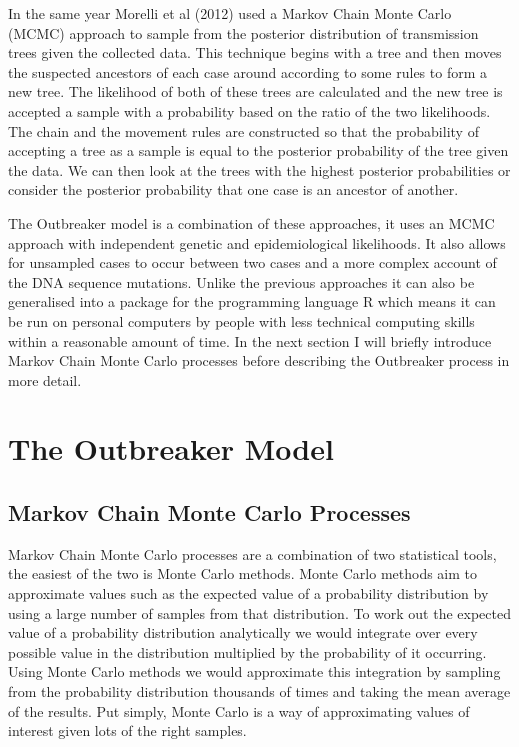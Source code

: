 \documentclass{article}
\begin{document}
In the same year Morelli et al (2012) used a Markov Chain Monte Carlo (MCMC) approach to sample from the posterior distribution of transmission trees given the collected data. This technique begins with a tree and then moves the suspected ancestors of each case around according to some rules to form a new tree. The likelihood of both of these trees are calculated and the new tree is accepted a sample with a probability based on the ratio of the two likelihoods. The chain and the movement rules are constructed so that the probability of accepting a tree as a sample is equal to the posterior probability of the tree given the data. We can then look at the trees with the highest posterior probabilities or consider the posterior probability that one case is an ancestor of another.

The Outbreaker model is a combination of these approaches, it uses an MCMC approach with independent genetic and epidemiological likelihoods. It also allows for unsampled cases to occur between two cases and a more complex account of the DNA sequence mutations. Unlike the previous approaches it can also be generalised into a package for the programming language R which means it can be run on personal computers by people with less technical computing skills within a reasonable amount of time. In the next section I will briefly introduce Markov Chain Monte Carlo processes before describing the Outbreaker process in more detail.

\section{The Outbreaker Model}
\subsection{Markov Chain Monte Carlo Processes}
Markov Chain Monte Carlo processes are a combination of two statistical tools, the easiest of the two is Monte Carlo methods. Monte Carlo methods aim to approximate values such as the expected value of a probability distribution by using a large number of samples from that distribution. To work out the expected value of a probability distribution analytically we would integrate over every possible value in the distribution multiplied by the probability of it occurring. Using Monte Carlo methods we would approximate this integration by sampling from the probability distribution thousands of times and taking the mean average of the results. Put simply, Monte Carlo is a way of approximating values of interest given lots of the right samples.
\end{document}
